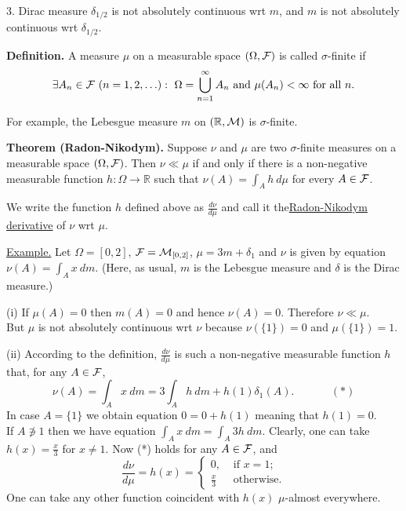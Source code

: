 \documentclass[a4paper,10pt]{article}
\def\RR{\mathbb{R}}
\newcommand{\1}[1]{\mathbf{1}_{\{#1\}}}
\begin{document}
3. Dirac measure $\delta_{1/2}$ is not absolutely continuous wrt $m$, and $m$ is not absolutely continuous wrt $\delta_{1/2}$.\vspace{3mm}

{\bf Definition.} A measure $\mu$ on a measurable space $(\Omega,{\cal F})$ is called $\sigma$-finite if
  $$\exists A_n\in{\cal F}~(n=1,2,\ldots):~\Omega=\bigcup_{n=1}^\infty A_n \mbox{ and } \mu(A_n)<\infty \mbox{ for all } n.$$ \vspace{3mm}

For example, the Lebesgue measure $m$ on $(\RR,{\cal M})$ is $\sigma$-finite. \vspace{3mm}

{\bf Theorem (Radon-Nikodym).} Suppose $\nu$ and $\mu$ are two $\sigma$-finite measures on a measurable space $(\Omega,{\cal F})$. Then $\nu\ll\mu$ if and only if there is a non-negative measurable function $h:\Omega\to\RR$ such that $\nu(A)=\displaystyle \int_A h~d\mu$ for every $A\in{\cal F}$.

We write the function $h$ defined above as $\frac{d\nu}{d\mu}$ and call it the\linebreak \underline{Radon-Nikodym derivative} of $\nu$ wrt $\mu$.\vspace{3mm}

\underline{Example.} Let $\Omega=[0,2]$, ${\cal F}={\cal M}_{[0,2]}$, $\mu=3m+\delta_1$ and $\nu$ is given by equation $\nu(A)=\int_A x~dm$. (Here, as usual, $m$ is the Lebesgue measure and $\delta$ is the Dirac measure.)

(i) If $\mu(A)=0$ then $m(A)=0$ and hence $\nu(A)=0$. Therefore $\nu\ll\mu$.\\
But $\mu$ is not absolutely continuous wrt $\nu$ because $\nu(\{1\})=0$ and $\mu(\{1\})=1$.

(ii) According to the definition, $\frac{ d\nu}{d\mu}$ is such a non-negative measurable function $h$ that, for any $A\in{\cal F}$,
  $$\nu(A)=\int_A x~dm=3\int_A h~dm+h(1)\delta_1(A).~~~~~~~~~~~~~~~(*)$$
In case $A=\{1\}$ we obtain equation $0=0+h(1)$ meaning that $h(1)=0$.\\
If $A\not\ni 1$ then we have equation $\int_A x~dm=\int_A 3h~dm$. Clearly, one can take $h(x)=\frac{x}{3}$ for $x\ne 1$. Now (*) holds for any $A\in{\cal F}$, and
  $$\frac{d\nu}{d\mu}=h(x)=\left\{\begin{array}{ll} 0, & \mbox{ if } x=1; \\ \frac{x}{3} & \mbox{ otherwise}. \end{array}\right. $$
One can take any other function coincident with $h(x)$ $\mu$-almost everywhere. \vspace{3mm}
\end{document}
